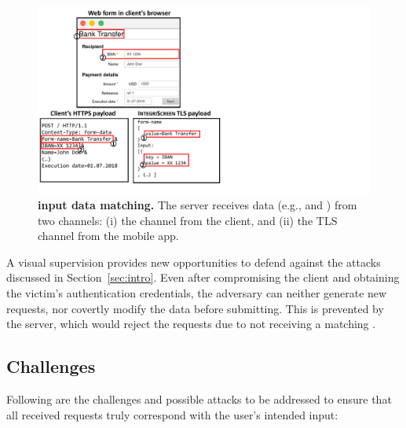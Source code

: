 \begin{figure}[t]
    \centering
    \includegraphics[trim={0 1cm 15cm 0},clip,width=0.9\linewidth]{chapters/IntegriScreen/img/inputMatching.pdf}
\caption{\textbf{\name input data matching.}
        The server receives data (e.g., \one and \two) from two channels: (i) the \https channel from the client, and (ii) the TLS channel from the \name mobile app.}
    \label{fig:traceMatching}
\end{figure}



A visual supervision provides new opportunities to defend against the attacks discussed in Section~\ref{sec:intro}.
Even after compromising the client and obtaining the victim's authentication credentials, the adversary can neither generate new requests, nor covertly modify the data before submitting.
This is prevented by the server, which would reject the requests due to not receiving a matching \POI.


\subsection{Challenges}
\label{sec:systemDesign:challenger}

Following are the challenges and possible attacks to be addressed to ensure that all received requests truly correspond with the user's intended input:

